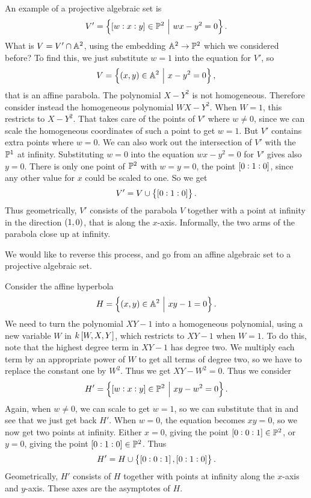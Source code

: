 \begin{example*}
An example of a projective algebraic set is
$$ V' = \cbr{\sbr{w : x : y} \in \PP^2 \st wx - y^2 = 0}. $$
What is $ V = V' \cap \AA^2 $, using the embedding $ \AA^2 \to \PP^2 $ which we considered before? To find this, we just substitute $ w = 1 $ into the equation for $ V' $, so
$$ V = \cbr{\br{x, y} \in \AA^2 \st x - y^2 = 0}, $$
that is an affine parabola. The polynomial $ X - Y^2 $ is not homogeneous. Therefore consider instead the homogeneous polynomial $ WX - Y^2 $. When $ W = 1 $, this restricts to $ X - Y^2 $. That takes care of the points of $ V' $ where $ w \ne 0 $, since we can scale the homogeneous coordinates of such a point to get $ w = 1 $. But $ V' $ contains extra points where $ w = 0 $. We can also work out the intersection of $ V' $ with the $ \PP^1 $ at infinity. Substituting $ w = 0 $ into the equation $ wx - y^2 = 0 $ for $ V' $ gives also $ y = 0 $. There is only one point of $ \PP^2 $ with $ w = y = 0 $, the point $ \sbr{0 : 1 : 0} $, since any other value for $ x $ could be scaled to one. So we get
$$ V' = V \cup \cbr{\sbr{0 : 1 : 0}}. $$
Thus geometrically, $ V' $ consists of the parabola $ V $ together with a point at infinity in the direction $ \br{1, 0} $, that is along the $ x $-axis. Informally, the two arms of the parabola close up at infinity.
\end{example*}

We would like to reverse this process, and go from an affine algebraic set to a projective algebraic set.

\begin{example*}
Consider the affine hyperbola
$$ H = \cbr{\br{x, y} \in \AA^2 \st xy - 1 = 0}. $$
We need to turn the polynomial $ XY - 1 $ into a homogeneous polynomial, using a new variable $ W $ in $ k\sbr{W, X, Y} $, which restricts to $ XY - 1 $ when $ W = 1 $. To do this, note that the highest degree term in $ XY - 1 $ has degree two. We multiply each term by an appropriate power of $ W $ to get all terms of degree two, so we have to replace the constant one by $ W^2 $. Thus we get $ XY - W^2 = 0 $. Thus we consider
$$ H' = \cbr{\sbr{w : x : y} \in \PP^2 \st xy - w^2 = 0}. $$
Again, when $ w \ne 0 $, we can scale to get $ w = 1 $, so we can substitute that in and see that we just get back $ H' $. When $ w = 0 $, the equation becomes $ xy = 0 $, so we now get two points at infinity. Either $ x = 0 $, giving the point $ \sbr{0 : 0 : 1} \in \PP^2 $, or $ y = 0 $, giving the point $ \sbr{0 : 1 : 0} \in \PP^2 $. Thus
$$ H' = H \cup \cbr{\sbr{0 : 0 : 1}, \sbr{0 : 1 : 0}}. $$
Geometrically, $ H' $ consists of $ H $ together with points at infinity along the $ x $-axis and $ y $-axis. These axes are the asymptotes of $ H $.
\end{example*}

